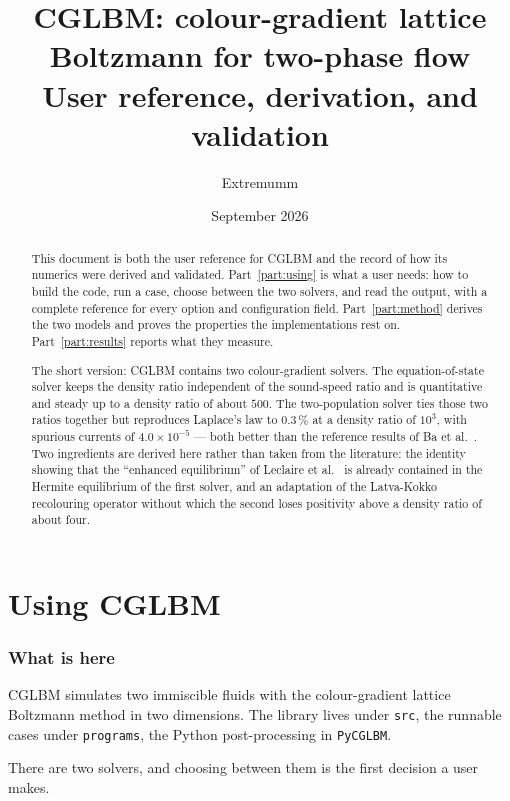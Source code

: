 \documentclass[11pt,a4paper]{article}
\title{CGLBM: colour-gradient lattice Boltzmann for two-phase flow\\
       \large User reference, derivation, and validation}
\author{Extremumm}
\date{September 2026}
\theoremstyle{plain}
\theoremstyle{definition}
\begin{document}
\maketitle

\begin{abstract}
This document is both the user reference for CGLBM and the record of how its
numerics were derived and validated. Part~\ref{part:using} is what a user needs:
how to build the code, run a case, choose between the two solvers, and read the
output, with a complete reference for every option and configuration field.
Part~\ref{part:method} derives the two models and proves the properties the
implementations rest on. Part~\ref{part:results} reports what they measure.

The short version: CGLBM contains two colour-gradient solvers. The
equation-of-state solver keeps the density ratio independent of the sound-speed
ratio and is quantitative and steady up to a density ratio of about $500$. The
two-population solver ties those two ratios together but reproduces Laplace's
law to $0.3\,\%$ at a density ratio of $10^3$, with spurious currents of
$4.0\times10^{-5}$ --- both better than the reference results of Ba et
al.~\cite{ba2016}. Two ingredients are derived here rather than taken from the
literature: the identity showing that the ``enhanced equilibrium'' of Leclaire
et al.~\cite{leclaire2013} is already contained in the Hermite equilibrium of
the first solver, and an adaptation of the Latva-Kokko recolouring operator
without which the second loses positivity above a density ratio of about four.
\end{abstract}

\tableofcontents

\part{Using CGLBM}
\label{part:using}

\section{What is here}
\label{sec:what}

CGLBM simulates two immiscible fluids with the colour-gradient lattice Boltzmann
method in two dimensions. The library lives under \texttt{src}, the runnable
cases under \texttt{programs}, the Python post-processing in \texttt{PyCGLBM}.

There are two solvers, and choosing between them is the first decision a user
makes.
\end{document}
